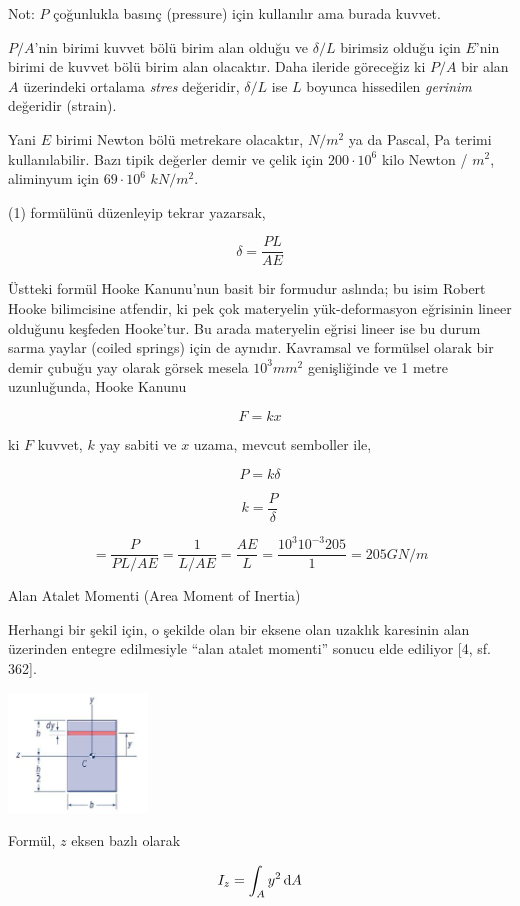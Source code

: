 \documentclass[12pt,fleqn]{article}\usepackage{../../common}
\begin{document}
Not: $P$ çoğunlukla basınç (pressure) için kullanılır ama burada kuvvet.

$P/A$'nin birimi kuvvet bölü birim alan olduğu ve $\delta / L$ birimsiz olduğu
için $E$'nin birimi de kuvvet bölü birim alan olacaktır. Daha ileride göreceğiz
ki $P/A$ bir alan $A$ üzerindeki ortalama {\em stres} değeridir, $\delta / L$
ise $L$ boyunca hissedilen {\em gerinim} değeridir (strain).

Yani $E$ birimi Newton bölü metrekare olacaktır, $N/m^2$ ya da Pascal, Pa terimi
kullanılabilir. Bazı tipik değerler demir ve çelik için $200\cdot 10^6$ kilo
Newton / $m^2$, aliminyum için $69 \cdot 10^6$ $kN / m^2$.

(1) formülünü düzenleyip tekrar yazarsak, 

$$
\delta = \frac{PL}{AE}
$$

Üstteki formül Hooke Kanunu'nun basit bir formudur aslında; bu isim Robert Hooke
bilimcisine atfendir, ki pek çok materyelin yük-deformasyon eğrisinin lineer
olduğunu keşfeden Hooke'tur. Bu arada materyelin eğrisi lineer ise bu durum
sarma yaylar (coiled springs) için de aynıdır. Kavramsal ve formülsel olarak
bir demir çubuğu yay olarak görsek mesela $10^3 mm^2$ genişliğinde ve
1 metre uzunluğunda, Hooke Kanunu

$$
F = k x
$$

ki $F$ kuvvet, $k$ yay sabiti ve $x$ uzama, mevcut semboller ile,

$$
P = k \delta
$$

$$
k = \frac{P}{\delta}
$$

$$
= \frac{P}{PL / AE} = \frac{1}{L / AE} = \frac{AE}{L} =
\frac{10^3 10^{-3} 205}{1} =
205 GN/m
$$

Alan Atalet Momenti (Area Moment of Inertia)

Herhangi bir şekil için, o şekilde olan bir eksene olan uzaklık karesinin alan
üzerinden entegre edilmesiyle ``alan atalet momenti'' sonucu elde ediliyor
[4, sf. 362]. 

\includegraphics[width=10em]{phy_020_strs_00_04.jpg}

Formül, $z$ eksen bazlı olarak

$$
I_z = \int_A y^2 \,\mathrm{d} A
$$
\end{document}
